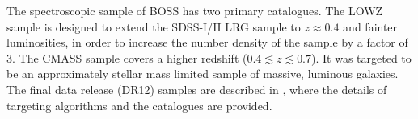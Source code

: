 \documentclass[iop]{emulateapj}
\begin{document}
The spectroscopic sample of BOSS has two primary catalogues.
The LOWZ sample is designed to extend the SDSS-I/II LRG sample to $z\approx 0.4$ and fainter luminosities,
in order to increase the number density of the sample by a factor of 3.
The CMASS sample covers a higher redshift ($0.4\lesssim z \lesssim 0.7$).
It was targeted to be an approximately stellar mass limited sample of massive, luminous galaxies.
The final data release (DR12) samples are described in \cite{Reidetal:2016},
where the details of targeting algorithms and the catalogues are provided.





\end{document}
